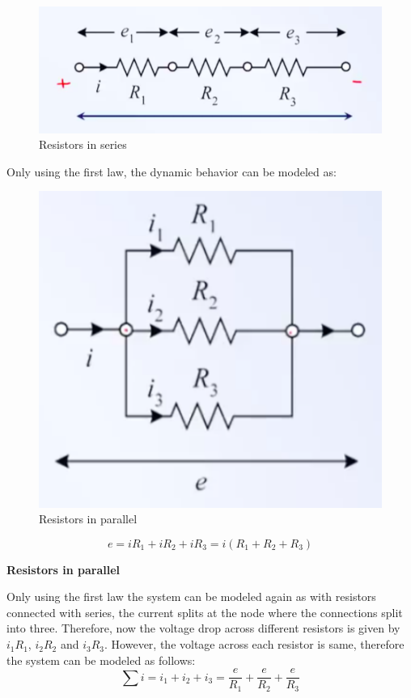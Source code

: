 \begin{figure}[h!]
	\centering
	\includegraphics[width=0.75\linewidth]{Bilder/Fund_ELK_SeriesRest}
	\caption{Resistors in series}
	\label{Fig_Fund_ELK_SeriesRest}
\end{figure}

Only using the first law, the dynamic behavior can be modeled as:

\begin{figure}[h!]
	\centering
	\includegraphics[width=0.75\linewidth]{Bilder/Fund_ELK_ParelRest}
	\caption{Resistors in parallel}
	\label{Fig_Fund_ELK_ParalRest}
\end{figure}

\begin{equation}
	e = i R_1 + i R_2 + i R_3 = i (R_1 + R_2 + R_3)
\end{equation}

\textbf{Resistors in parallel}

Only using the first law the system can be modeled again as with resistors connected with series, the current splits at the node where the connections split into three. Therefore, now the voltage drop across different resistors is given by $i_1 R_1$, $i_2 R_2$ and $i_3 R_3$. However, the voltage across each resistor is same, therefore the system can be modeled as follows:
\begin{equation}
	\sum i = i_1 + i_2 + i_3 = \frac{e}{R_1} + \frac{e}{R_2} + \frac{e}{R_3}
\end{equation}

